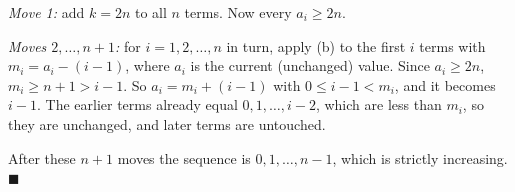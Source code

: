 \emph{Move 1:} add $k=2n$ to all $n$ terms. Now every $a_i\ge2n$.

\emph{Moves $2,\dots,n+1$:} for $i=1,2,\dots,n$ in turn, apply (b) to the first $i$ terms with $m_i=a_i-(i-1)$, where $a_i$ is the current (unchanged) value. Since $a_i\ge2n$, $m_i\ge n+1>i-1$. So $a_i=m_i+(i-1)$ with $0\le i-1<m_i$, and it becomes $i-1$. The earlier terms already equal $0,1,\dots,i-2$, which are less than $m_i$, so they are unchanged, and later terms are untouched.

After these $n+1$ moves the sequence is $0,1,\dots,n-1$, which is strictly increasing. $\blacksquare$
